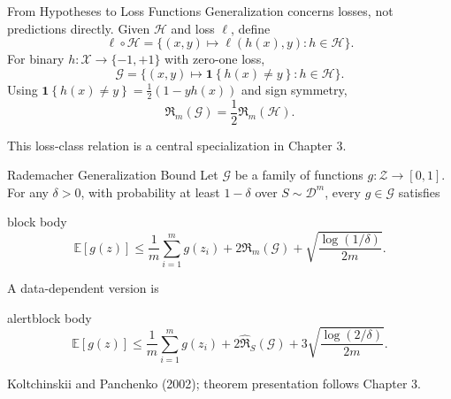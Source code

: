 \documentclass[aspectratio=169,10pt]{beamer}
\newcommand{\X}{\mathcal{X}}
\newcommand{\Z}{\mathcal{Z}}
\newcommand{\D}{\mathcal{D}}
\newcommand{\Hc}{\mathcal{H}}
\newcommand{\Gc}{\mathcal{G}}
\newcommand{\Rad}{\mathfrak{R}}
\newcommand{\RadS}{\widehat{\mathfrak{R}}_S}
\newcommand{\ind}[1]{\mathbf{1}\!\left\{#1\right\}}
\newcommand{\pmone}{\{-1,+1\}}
\newcommand{\E}{\mathbb{E}}
\newcommand{\SourceNote}[1]{%
  \vfill
  \begin{flushright}
    {\scriptsize\color{midgray}#1}
  \end{flushright}
}
\begin{document}
\begin{frame}[t]{From Hypotheses to Loss Functions}
  \vspace{0.06cm}
  Generalization concerns losses, not predictions directly. Given $\Hc$ and loss $\ell$, define
  \[
    \ell\circ\Hc
    =\bigl\{(x,y)\mapsto \ell(h(x),y):h\in\Hc\bigr\}.
  \]
  For binary $h:\X\to\pmone$ with zero-one loss,
  \[
    \Gc=\{(x,y)\mapsto\ind{h(x)\ne y}:h\in\Hc\}.
  \]
  Using $\ind{h(x)\ne y}=\tfrac12(1-yh(x))$ and sign symmetry,
  \[
    \boxed{\Rad_m(\Gc)=\frac12\Rad_m(\Hc).}
  \]
  \SourceNote{This loss-class relation is a central specialization in Chapter 3.}
\end{frame}

\begin{frame}[t]{Rademacher Generalization Bound}
  \vspace{0.02cm}
  Let $\Gc$ be a family of functions $g:\Z\to[0,1]$. For any $\delta>0$, with probability at least $1-\delta$ over $S\sim\D^m$, every $g\in\Gc$ satisfies
  \begin{beamercolorbox}[rounded=true,sep=0.18cm,wd=\linewidth]{block body}
    \[
      \E[g(z)]
      \le \frac1m\sum_{i=1}^m g(z_i)
      +2\Rad_m(\Gc)
      +\sqrt{\frac{\log(1/\delta)}{2m}}.
    \]
  \end{beamercolorbox}
  A data-dependent version is
  \begin{beamercolorbox}[rounded=true,sep=0.18cm,wd=\linewidth]{alertblock body}
    \[
      \E[g(z)]
      \le \frac1m\sum_{i=1}^m g(z_i)
      +2\RadS(\Gc)
      +3\sqrt{\frac{\log(2/\delta)}{2m}}.
    \]
  \end{beamercolorbox}
  \SourceNote{Koltchinskii and Panchenko (2002); theorem presentation follows Chapter 3.}
\end{frame}
\end{document}
